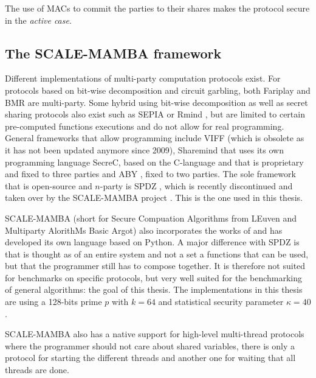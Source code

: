 The use of MACs to commit the parties to their shares makes the protocol secure in the \emph{active case}.

\subsection{The SCALE-MAMBA framework}
Different implementations of multi-party computation protocols exist. For protocols based on bit-wise decomposition and circuit garbling, both Fariplay \cite{Malkhi2004FairplaySystem} and BMR \cite{Beaver1990TheProtocols} are multi-party. Some hybrid using bit-wise decomposition as well as secret sharing protocols also exist such as SEPIA \cite{Burkhart2010SEPIA:Statistics} or Rmind \cite{Bogdanov2018Rmind:Analysis}, but are limited to certain pre-computed functions executions and do not allow for real programming. General frameworks that allow programming include VIFF \cite{Damgard2009AsynchronousImplementation} (which is obsolete as it has not been updated anymore since 2009), Sharemind \cite{Bogdanov2008Sharemind:Computations,Bogdanov2013Sharemind:Applications} that uses its own programming language SecreC, based on the C-language \cite{Ristioja2010AnLanguage,Jagomagis2010SecreCMining,Bogdanov2014Domain-PolymorphicOf} and that is proprietary and fixed to three parties and ABY \cite{Demmler2015ABYComputation}, fixed to two parties. The sole framework that is open-source and $n$-party is SPDZ \cite{Damgard2012MultipartyEncryption,Damgard2012PracticalLimits.}, which is recently discontinued and taken over by the SCALE-MAMBA project \cite{Aly2018SCALEDocumentation}. This is the one used in this thesis.

SCALE-MAMBA (short for Secure Compuation Algorithms from LEuven and Multiparty AlorithMs Basic Argot) also incorporates the works of \cite{Bendlin2011Semi-homomorphicComputation,Nielsen2012AComputation} and has developed its own language based on Python. A major difference with SPDZ is that is thought as of an entire system and not a set a functions that can be used, but that the programmer still has to compose together. It is therefore not suited for benchmarks on specific protocols, but very well suited for the benchmarking of general algorithms: the goal of this thesis. The implementations in this thesis are using a 128-bits prime $p$ with $k=64$ and statistical security parameter $\kappa=40$. 

SCALE-MAMBA also has a native support for high-level multi-thread protocols where the programmer should not care about shared variables, there is only a protocol for starting the different threads and another one for waiting that all threads are done. 

